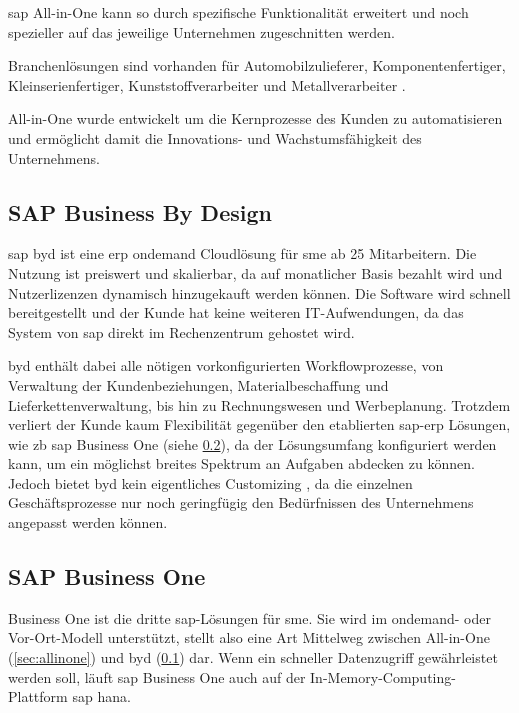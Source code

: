 \gls{sap} All-in-One kann so durch spezifische Funktionalität erweitert und noch spezieller auf das jeweilige Unternehmen zugeschnitten werden.

Branchenlösungen sind vorhanden für Automobilzulieferer, Komponentenfertiger, Kleinserienfertiger, Kunststoffverarbeiter und Metallverarbeiter \cite{AiOBeratung}.

All-in-One wurde entwickelt um die Kernprozesse des Kunden zu automatisieren und ermöglicht damit die Innovations- und Wachstumsfähigkeit des Unternehmens.

\subsection{SAP Business By Design}
\label{sec:byd}

\gls{sap} \gls{byd} ist eine \gls{erp} \gls{ondemand} Cloudlösung für \gls{sme} ab 25 Mitarbeitern. Die Nutzung ist preiswert und skalierbar, da auf monatlicher Basis bezahlt wird und Nutzerlizenzen dynamisch hinzugekauft werden können. Die Software wird schnell bereitgestellt und der Kunde hat keine weiteren IT-Aufwendungen, da das System von \gls{sap} direkt im Rechenzentrum gehostet wird.

\gls{byd} enthält dabei alle nötigen vorkonfigurierten Workflowprozesse, von Verwaltung der Kundenbeziehungen, Materialbeschaffung und Lieferkettenverwaltung, bis hin zu Rechnungswesen und Werbeplanung. Trotzdem verliert der Kunde kaum Flexibilität gegenüber den etablierten \gls{sap}-\gls{erp} Lösungen, wie \gls{zb} \gls{sap} Business One (siehe \ref{sec:business-one}), da der Lösungsumfang konfiguriert werden kann, um ein möglichst breites Spektrum an Aufgaben abdecken zu können. Jedoch bietet \gls{byd} kein eigentliches Customizing \cite{ERP4Students}, da die einzelnen Geschäftsprozesse nur noch geringfügig den Bedürfnissen des Unternehmens angepasst werden können.

\subsection{SAP Business One}
\label{sec:business-one}

Business One ist die dritte \gls{sap}-Lösungen für \gls{sme}. Sie wird im \gls{ondemand}- oder Vor-Ort-Modell unterstützt, stellt also eine Art Mittelweg zwischen All-in-One (\ref{sec:allinone}) und \gls{byd} (\ref{sec:byd}) dar. Wenn ein schneller Datenzugriff gewährleistet werden soll, läuft \gls{sap} Business One auch auf der In-Memory-Computing-Plattform \gls{sap} \gls{hana}.

